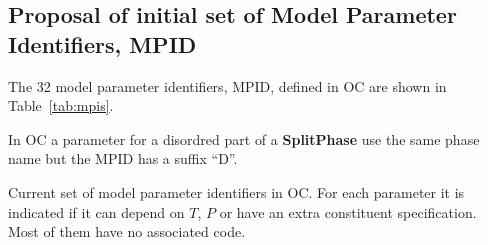 \documentclass{article}
\begin{document}
\begin{appendices}
\newpage
\setcounter{equation}{0}
\renewcommand{\theequation}{C\arabic{equation}}
\setcounter{figure}{0}
\renewcommand{\thefigure}{C\arabic{figure}}
\setcounter{table}{0}
\renewcommand{\thetable}{C\arabic{table}}

\section{Proposal of initial set of Model Parameter Identifiers, MPID}\label{sec:mpid2}

The 32 model parameter identifiers, MPID, defined in OC are shown in
Table~\ref{tab:mpis}.

In OC a parameter for a disordred part of a {\bf SplitPhase} use the
same phase name but the MPID has a suffix ``D''.

\begin{table}[!h]
  \caption{Current set of model parameter identifiers in OC.  For each
    parameter it is indicated if it can depend on $T$, $P$ or have an
    extra constituent specification.  Most of them have no associated
    code.}\label{tab:mpis}


\end{table}
\end{appendices}
\end{document}
